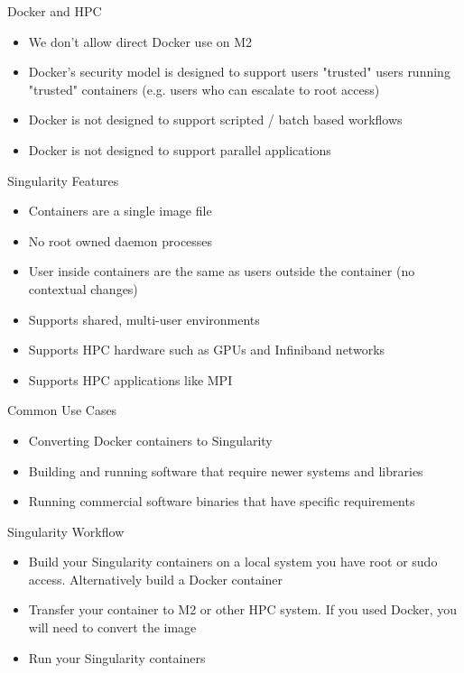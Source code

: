\begin{frame}{Docker and HPC}
	\begin{itemize}
		\item We don't allow direct Docker use on M2 
		\item Docker's security model is designed to support users "trusted" users running "trusted" containers (e.g. users who can escalate to root access)
		\item Docker is not designed to support scripted / batch based workflows
		\item Docker is not designed to support parallel applications
	\end{itemize}
\end{frame}

\begin{frame}{Singularity Features}
	\begin{itemize}
		\item Containers are a single image file
		\item No root owned daemon processes
		\item User inside containers are the same as users outside the container (no contextual changes)
		\item Supports shared, multi-user environments
		\item Supports HPC hardware such as GPUs and Infiniband networks
		\item Supports HPC applications like MPI
	\end{itemize}
\end{frame}

\begin{frame}{Common Use Cases}
	\begin{itemize}
		\item Converting Docker containers to Singularity
		\item Building and running software that require newer systems and libraries 
		\item Running commercial software binaries that have specific requirements
	\end{itemize}
\end{frame}

\begin{frame}{Singularity Workflow}
	\begin{itemize}
		\item Build your Singularity containers on a local system you have root or sudo access. Alternatively build a Docker container
		\item Transfer your container to M2 or other HPC system. If you used Docker, you will need to convert the image 
		\item Run your Singularity containers
	\end{itemize}
\end{frame}

